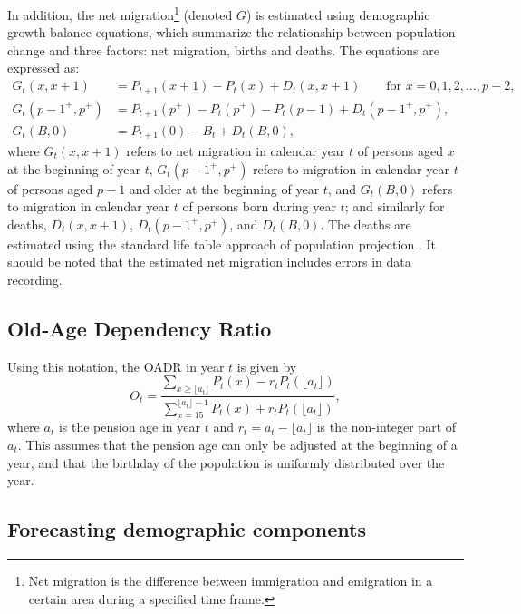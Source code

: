 \documentclass[11pt,a4paper,]{article}
\begin{document}
In addition, the net migration\footnote{Net migration is the difference between immigration and emigration in a certain area during a specified time frame.} (denoted \(G\)) is estimated using demographic growth-balance equations, which summarize the relationship between population change and three factors: net migration, births and deaths. The equations are expressed as:
\begin{align*}
  G_t(x,x+1)     & =P_{t+1}(x+1)-P_t(x)+D_t(x,x+1)\qquad\text{for $x=0,1,2,\dots,p-2$},\\
  G_t(p-1^+,p^+) & =P_{t+1}(p^+)-P_t(p^+)-P_t(p-1)+D_t(p-1^+,p^+),\\
  G_t(B,0)       & =P_{t+1}(0)-B_t+D_t(B,0),
\end{align*}
where \(G_t(x,x+1)\) refers to net migration in calendar year \(t\) of persons aged \(x\) at the beginning of year \(t\), \(G_t(p-1^+,p^+)\) refers to migration in calendar year \(t\) of persons aged \(p-1\) and older at the beginning of year \(t\), and \(G_t(B,0)\) refers to migration in calendar year \(t\) of persons born during year \(t\); and similarly for deaths, \(D_t(x,x+1)\), \(D_t(p-1^+,p^+)\), and \(D_t(B,0)\). The deaths are estimated using the standard life table approach of population projection \autocite{Preston2000}. It should be noted that the estimated net migration includes errors in data recording.

\hypertarget{old-age-dependency-ratio}{%
\subsection{Old-Age Dependency Ratio}\label{old-age-dependency-ratio}}

Using this notation, the OADR in year \(t\) is given by
\begin{equation}\label{eq:oadr}
O_t = \frac{\displaystyle\sum_{x\ge \lfloor a_t\rfloor} P_t(x) - r_t P_t(\lfloor a_t\rfloor)}{\displaystyle\sum_{x=15}^{\lfloor a_t\rfloor-1} P_t(x) + r_t P_t(\lfloor a_t\rfloor)},
\end{equation}
where \(a_t\) is the pension age in year \(t\) and \(r_t = a_t - \lfloor a_t \rfloor\) is the non-integer part of \(a_t\). This assumes that the pension age can only be adjusted at the beginning of a year, and that the birthday of the population is uniformly distributed over the year.

\hypertarget{forecasting-demographic-components}{%
\subsection{Forecasting demographic components}\label{forecasting-demographic-components}}
\end{document}
